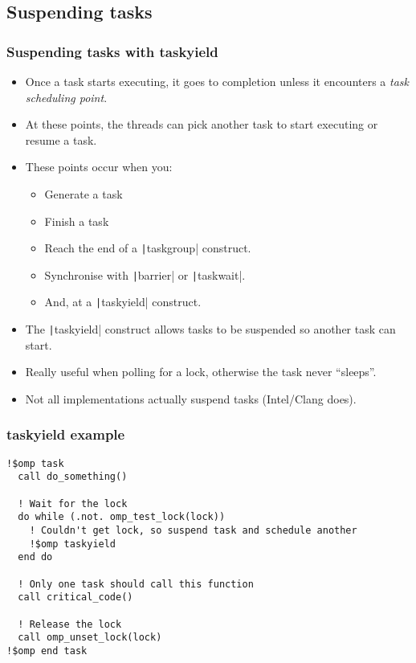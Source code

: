 \documentclass{beamer}
\begin{document}
\subsection{Suspending tasks}
\begin{frame}
\frametitle{Suspending tasks with taskyield}
\begin{itemize}
  \item Once a task starts executing, it goes to completion unless it encounters a \emph{task scheduling point}.
  \item At these points, the threads can pick another task to start executing or resume a task.
  \item These points occur when you:
    \begin{itemize}
      \item Generate a task
      \item Finish a task
      \item Reach the end of a \texttt|taskgroup| construct.
      \item Synchronise with \texttt|barrier| or \texttt|taskwait|.
      \item And, at a \texttt|taskyield| construct.
    \end{itemize}
   \item The \texttt|taskyield| construct allows tasks to be suspended so another task can start.
   \item Really useful when polling for a lock, otherwise the task never ``sleeps''.
   \item Not all implementations actually suspend tasks (Intel/Clang does).
\end{itemize}
\end{frame}

\begin{frame}[fragile]
\frametitle{taskyield example}
\begin{verbatim}
!$omp task
  call do_something()

  ! Wait for the lock
  do while (.not. omp_test_lock(lock))
    ! Couldn't get lock, so suspend task and schedule another
    !$omp taskyield
  end do

  ! Only one task should call this function
  call critical_code()

  ! Release the lock
  call omp_unset_lock(lock)
!$omp end task
\end{verbatim}

\end{frame}
\end{document}
